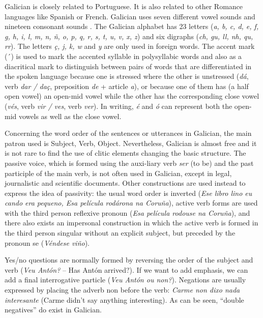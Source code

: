 \begin{multicols}{2}
\begin{itemize}
\begin{multicols}{2}
   Galician is closely related to Portuguese. It is also related to other Romance languages like Spanish or French. Galician uses seven different vowel sounds and nineteen consonant sounds . The Galician alphabet has 23 letters (\textit{a, b, c, d, e, f, g, h, i, l, m, n, ñ, o, p, q, r, s, t, u, v, x, z}) and six digraphs (\textit{ch, gu, ll, nh, qu, rr}). The letters \textit{ç, j, k, w} and \textit{y} are only used in foreign words. The accent mark (´) is used to mark the accented syllable in polysyllabic words and also as a diacritical mark to distinguish between pairs of words that are differentiated in the spoken language because one is stressed where the other is unstressed (\textit{dá}, verb \textit{dar / daç}, preposition \textit{de} + article \textit{a}), or because one of them has (a half open vowel) an open-mid vowel while the other has the corresponding close vowel (\textit{vés}, verb \textit{vir / ves}, verb \textit{ver}). In writing, \textit{é} and \textit{ó} can represent both the open-mid vowels as well as the close vowel.


Concerning the word order of the sentences or utterances in Galician, the main patron used is Subject, Verb, Object. Nevertheless, Galician is almost free and it is not rare to find the use of clitic elements changing the basic structure. The passive voice, which is formed using the auxi-liary verb \textit{ser} (to be) and the past participle of the main verb, is not often used in Galician, except in legal, journalistic and scientific documents. Other constructions are used instead to express the idea of passivity: the usual word order is inverted (\textit{Ese libro lino eu cando era pequeno, Esa película rodárona na Coruña}), active verb forms are used with the third person reflexive pronoun (\textit{Esa película rodouse na Coruña}), and there also exists an impersonal construction in which the active verb is formed in the third person singular without an explicit subject, but preceded by the pronoun se (\textit{Véndese viño}).
 
Yes/no questions are normally formed by reversing the order of the subject and verb (\textit{Veu Antón?} – Has Antón arrived?). If we want to add emphasis, we can add a final interrogative particle (\textit{Veu Antón ou non?}). Negations are usually expressed by placing the adverb non before the verb: \textit{Carme non dixo nada interesante} (Carme didn’t say anything interesting). As can be seen, “double negatives” do exist in Galician.


\end{multicols}
\end{itemize}
\end{multicols}
